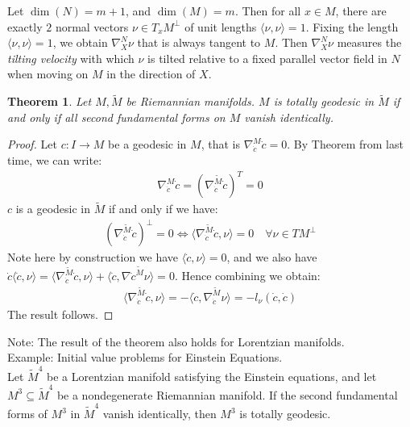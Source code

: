 \documentclass[11pt]{book}
\theoremstyle{break}
\theoremstyle{break}
\newtheorem{thm}{Theorem}[section]
\newcommand{\that}[1]{\widetilde{#1}}
\newcommand{\note}{\color{red}Note: \color{black}}
\newcommand{\example}{\color{green}Example: \color{black}}
\begin{document}
\newpage
Let $\dim(N) = m+1$, and $\dim(M) = m$. Then for all $x \in M$, there are exactly $2$ normal vectors $\nu \in T_xM^{\perp}$ of unit lengths $\langle \nu,\nu \rangle = 1$. Fixing the length $\langle \nu, \nu\rangle = 1$, we obtain $\nabla_X^N\nu $ that is always tangent to $M$. Then $\nabla_X^N\nu$ measures the \textit{tilting velocity} with which $\nu$ is tilted relative to a fixed parallel vector field in $N$ when moving on $M$ in the direction of $X$. 

\begin{thm}
Let $M,\that{M}$ be Riemannian manifolds. $M$ is totally geodesic in $\that{M}$ if and only if all second fundamental forms on $M$ vanish identically.
\end{thm}
\begin{proof}
Let $c:I \to M$ be a geodesic in $M$, that is $\nabla_{\dot{c}}^M\dot{c}=0$. By Theorem from last time, we can write:
\begin{align*}
\nabla_{\dot{c}}^M \dot{c} = \left( \nabla_{\dot{c}}^{\that{M}}\dot{c}\right)^T = 0
\end{align*}
$c$ is a geodesic in $\that{M}$ if and only if we have:
\begin{align*}
\left( \nabla_{\dot{c}}^{\that{M}}\dot{c}\right)^{\perp} = 0  \iff \langle \nabla_{\dot{c}}^{\that{M}}\dot{c}, \nu \rangle = 0 \quad \forall \nu \in TM^{\perp}
\end{align*}
Note here by construction we have $\langle \dot{c},\nu \rangle = 0$, and we also have $\dot{c}\langle \dot{c},\nu \rangle = \langle \nabla_{\dot{c}}^{\that{M}}\dot{c},\nu \rangle + \langle \dot{c}, \nabla{\dot{c}^{\that{M}}\nu }\rangle = 0$. Hence combining we obtain:
\begin{align*}
\langle \nabla_{\dot{c}}^{\that{M}}\dot{c}, \nu \rangle = -\langle \dot{c}, \nabla_{\dot{c}}^{\that{M}} \nu \rangle = -l_\nu (\dot{c},\dot{c})
\end{align*}
The result follows. 
\end{proof}

\note The result of the theorem also holds for Lorentzian manifolds.\\

\example Initial value problems for Einstein Equations.\\
Let $\that{M}^4$ be a Lorentzian manifold satisfying the Einstein equations, and let $M^3\subseteq \that{M}^4$ be a nondegenerate Riemannian manifold. If the second fundamental forms of $M^3$ in $\that{M}^4$ vanish identically, then $M^3$ is totally geodesic.\\
\end{document}
